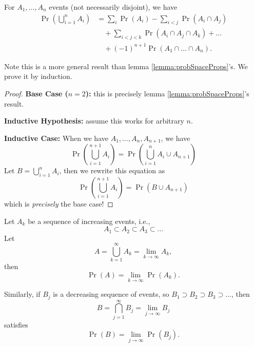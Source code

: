 \begin{lemma}
For $A_{1},\dots,A_{n}$ events (not necessarily disjoint), we have
\begin{equation}
\begin{split}
\Pr\left(\bigcup^{n}_{i=1}A_{i}\right)&=\sum_{i}\Pr(A_{i})-\sum_{i<j}\Pr(A_{i}\cap A_{j})\\
&\quad+\sum_{i<j<k}\Pr(A_{i}\cap A_{j}\cap A_{k})+\dots\\
&\quad+(-1)^{n+1}\Pr(A_{1}\cap\dots\cap A_{n}).
\end{split}
\end{equation}
\end{lemma}
\noindent Note this is a more general result than lemma \ref{lemma:probSpaceProps}'s.
We prove it by induction.
\begin{proof}
\textbf{Base Case ($n=2$):} this is precisely
lemma \ref{lemma:probSpaceProps}'s result.

\textbf{Inductive Hypothesis:} assume this works for arbitrary $n$.

\textbf{Inductive Case:} When we have $A_{1},\dots,A_{n},A_{n+1}$, we
have
\begin{equation}
\Pr\left(\bigcup^{n+1}_{i=1}A_{i}\right)=\Pr\left(\bigcup^{n}_{i=1}A_{i}\cup
A_{n+1}\right)
\end{equation}
Let $B=\bigcup^{n}_{i=1}A_{i}$, then we rewrite this equation as
\begin{equation}
\Pr\left(\bigcup^{n+1}_{i=1}A_{i}\right)=\Pr\left(B\cup A_{n+1}\right)
\end{equation}
which is \emph{precisely} the base case!
\end{proof}

\label{prop:sequenceOfEvents}%
Let $A_{k}$ be a sequence of increasing events, i.e.,
\begin{equation}
A_{1}\subset A_{2}\subset A_{3}\subset\dots
\end{equation}
Let
\begin{equation}
A = \bigcup^{\infty}_{k=1}A_{k}=\lim_{k\to\infty}A_{k},
\end{equation}
then
\begin{equation}
\Pr(A)=\lim_{k\to\infty}\Pr(A_{k}).
\end{equation}

Similarly, if $B_{j}$ is a decreasing sequence of events, so
$B_{1}\supset B_{2}\supset B_{3}\supset\dots$, then
\begin{equation}
B=\bigcap^{\infty}_{j=1}B_{j}=\lim_{j\to\infty}B_{j}
\end{equation}
satisfies
\begin{equation}
\Pr(B)=\lim_{j\to\infty}\Pr(B_{j}).
\end{equation}

